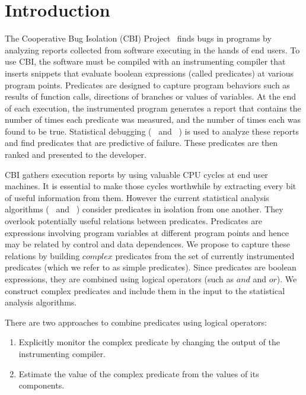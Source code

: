 \section{Introduction}

The Cooperative Bug Isolation (CBI) Project~\cite{Liblit:2004:CBI} finds bugs in programs by analyzing reports collected from software executing in the hands of end users.  To use CBI, the software must be compiled with an instrumenting compiler that inserts snippets that evaluate boolean expressions (called predicates) at various program points.  Predicates are designed to capture program behaviors such as results of function calls, directions of branches or values of variables.  At the end of each execution, the instrumented program generates a report that contains the number of times each predicate was measured, and the number of times each was found to be true.  Statistical debugging (~\cite{Liblit:2005:SSBI} and ~\cite{Zheng:2006:SDSIMB}) is used to analyze these reports and find predicates that are predictive of failure.  These predicates are then ranked and presented to the developer.

CBI gathers execution reports by using valuable CPU cycles at end user machines.  It is essential to make those cycles worthwhile by extracting every bit of useful information from them.  However the current statistical analysis algorithms (~\cite{Liblit:2005:SSBI} and ~\cite{Zheng:2006:SDSIMB}) consider predicates in isolation from one another.  They overlook potentially useful relations between predicates.  Predicates are expressions involving program variables at different program points and hence may be related by control and data dependences.  We propose to capture these relations by building $complex$ predicates from the set of currently instrumented predicates (which we refer to as simple predicates).  Since predicates are boolean expressions, they are combined using logical operators (such as $and$ and $or$).  We construct complex predicates and include them in the input to the statistical analysis algorithms.

There are two approaches to combine predicates using logical operators:
\begin{enumerate}
\item Explicitly monitor the complex predicate by changing the output of the instrumenting compiler.
\item Estimate the value of the complex predicate from the values of its components.
\end{enumerate}


